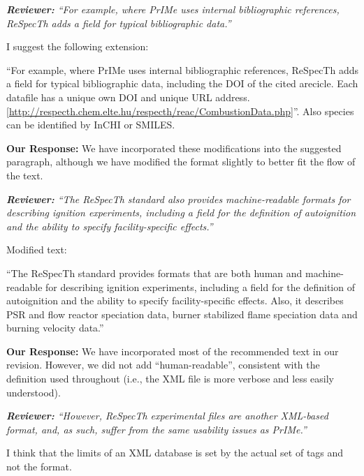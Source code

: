 \documentclass[a4paper,10pt]{elsarticle}
\newenvironment{reviewer}{\vspace{0.5\baselineskip}\begingroup\itshape\textbf{Reviewer:}}{\endgroup\vspace{0.5\baselineskip}}
\newenvironment{response}{\vspace{0.5\baselineskip}\textbf{Our Response:}}{\vspace{0.5\baselineskip}}
\begin{document}
\begin{reviewer}
    ``For example, where PrIMe uses internal bibliographic references, ReSpecTh adds a field for
    typical bibliographic data.''

    I suggest the following extension:

    ``For example, where PrIMe uses internal bibliographic references, ReSpecTh adds a field for
    typical bibliographic data, including the DOI of the cited arecicle. Each datafile has a unique
    own DOI and unique URL address.
    [\url{http://respecth.chem.elte.hu/respecth/reac/CombustionData.php}]''. Also species can be
    identified by InCHI or SMILES.
\end{reviewer}

\begin{response}
    We have incorporated these modifications into the suggested paragraph, although we have modified
    the format slightly to better fit the flow of the text.
\end{response}

\begin{reviewer}
    ``The ReSpecTh standard also provides machine-readable formats for describing ignition
    experiments, including a field for the definition of autoignition and the ability to specify
    facility-specific effects.''

    Modified text:

    ``The ReSpecTh standard provides formats that are both human and machine-readable for describing
    ignition experiments, including a field for the definition of autoignition and the ability to
    specify facility-specific effects. Also, it describes PSR and flow reactor speciation data,
    burner stabilized flame speciation data and burning velocity data.''
\end{reviewer}

\begin{response}
    We have incorporated most of the recommended text in our revision. However, we did not add
    ``human-readable'', consistent with the definition used throughout (i.e., the XML file is more
    verbose and less easily understood).
\end{response}

\begin{reviewer}
    ``However, ReSpecTh experimental files are another XML-based format, and, as such, suffer from
    the same usability issues as PrIMe.''

    I think that the limits of an XML database is set by the actual set of tags and not the format.
\end{reviewer}
\end{document}
